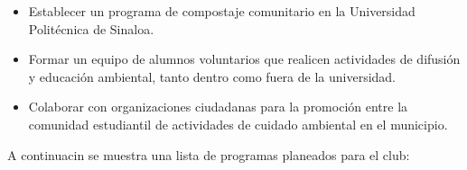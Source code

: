 \begin{itemize}
    \item Establecer un programa de compostaje comunitario en la Universidad Politécnica de Sinaloa. 
    \item Formar un equipo de alumnos voluntarios que realicen actividades de difusión y educación ambiental, tanto dentro como fuera de la universidad. 
    \item Colaborar con organizaciones ciudadanas para la promoción entre la comunidad estudiantil de actividades de cuidado ambiental en el municipio. 
\end{itemize}

A continuacin se muestra una lista de programas planeados para el club:

%    

